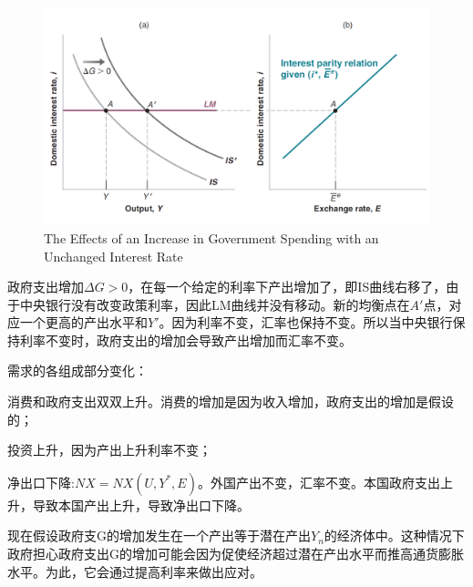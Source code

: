 \documentclass{article}
\begin{document}
\begin{figure}[H] %
	\centering %
	\includegraphics[width=1\textwidth]{19_4} %
	\caption{The Effects of an Increase
		in Government Spending
		with an Unchanged
		Interest Rate} %
	\label{Fig.main5} %
\end{figure}

政府支出增加$ \Delta G>0 $，在每一个给定的利率下产出增加了，即IS曲线右移了，由于中央银行没有改变政策利率，因此LM曲线并没有移动。新的均衡点在$ A' $点，对应一个更高的产出水平和$ Y' $。因为利率不变，汇率也保持不变。所以当中央银行保持利率不变时，政府支出的增加会导致产出增加而汇率不变。

\hspace*{\fill}

需求的各组成部分变化：

消费和政府支出双双上升。消费的增加是因为收入增加，政府支出的增加是假设的；

投资上升，因为产出上升利率不变；

净出口下降:$ NX=NX(U,Y^*,E) $。外国产出不变，汇率不变。本国政府支出上升，导致本国产出上升，导致净出口下降。

\hspace*{\fill}

现在假设政府支G的增加发生在一个产出等于潜在产出$ Y_n $的经济体中。这种情况下政府担心政府支出G的增加可能会因为促使经济超过潜在产出水平而推高通货膨胀水平。为此，它会通过提高利率来做出应对。
\end{document}
